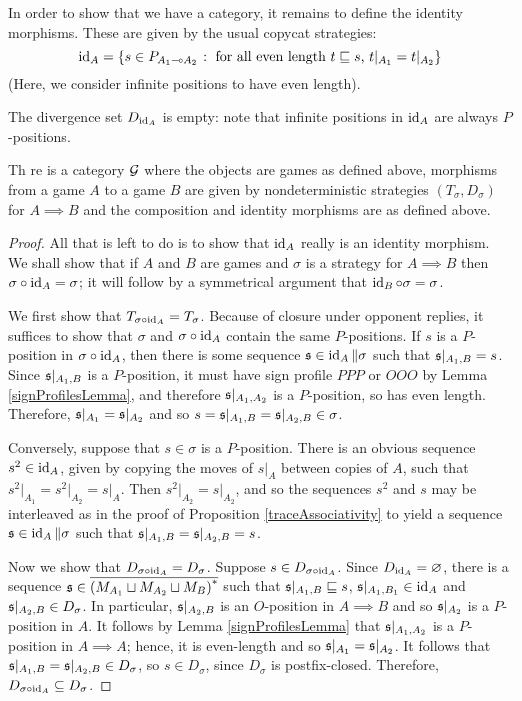 \documentclass{article}
\begin{document}
In order to show that we have a category, it remains to define the identity morphisms.  These are given by the usual copycat strategies:
\[
  \operatorname{id}_A = \{s\in P_{A_1\multimap A_2}\;\colon\;\textrm{for all even length $t\sqsubseteq s$, $t\vert_{A_1}=t\vert_{A_2}$}\}
  \]
(Here, we consider infinite positions to have even length).

The divergence set $D_{\operatorname{id}_A}$ is empty: note that infinite positions in $\operatorname{id}_A$ are always $P$-positions.

\begin{theorem}
  Th re is a category $\mathcal G$ where the objects are games as defined above, morphisms from a game $A$ to a game $B$ are given by nondeterministic strategies $(T_\sigma, D_\sigma)$ for $A\implies B$ and the composition and identity morphisms are as defined above.
  \begin{proof}
    All that is left to do is to show that $\operatorname{id}_A$ really is an identity morphism.  We shall show that if $A$ and $B$ are games and $\sigma$ is a strategy for $A\implies B$ then $\sigma \circ \operatorname{id}_A=\sigma$; it will follow by a symmetrical argument that $\operatorname{id}_B \circ \sigma = \sigma$.

    We first show that $T_{\sigma \circ \operatorname{id}_A}=T_\sigma$.  Because of closure under opponent replies, it suffices to show that $\sigma$ and $\sigma \circ \operatorname{id}_A$ contain the same $P$-positions.  If $s$ is a $P$-position in $\sigma \circ \operatorname{id}_A$, then there is some sequence $\mathfrak s\in\operatorname{id}_A\|\sigma$ such that $\mathfrak s\vert_{A_1,B}=s$.  Since $\mathfrak s\vert_{A_1,B}$ is a $P$-position, it must have sign profile $PPP$ or $OOO$ by Lemma \ref{signProfilesLemma}, and therefore $\mathfrak s\vert_{A_1,A_2}$ is a $P$-position, so has even length.  Therefore, $\mathfrak s\vert_{A_1}=\mathfrak s\vert_{A_2}$ and so $s=\mathfrak s\vert_{A_1,B}=\mathfrak s\vert_{A_2,B}\in\sigma$.

    Conversely, suppose that $s\in\sigma$ is a $P$-position.  There is an obvious sequence $s^2\in\operatorname{id}_A$, given by copying the moves of $s\vert_A$ between copies of $A$, such that $s^2\vert_{A_1}=s^2\vert_{A_2}=s\vert_A$.  Then $s^2\vert_{A_2}=s\vert_{A_2}$, and so the sequences $s^2$ and $s$ may be interleaved as in the proof of Proposition \ref{traceAssociativity} to yield a sequence $\mathfrak s\in\operatorname{id}_A\|\sigma$ such that $\mathfrak s\vert_{A_1,B}=\mathfrak s\vert_{A_2,B}=s$.  

    Now we show that $D_{\sigma \circ \operatorname{id}_A}=D_\sigma$.  Suppose $s\in D_{\sigma \circ \operatorname{id}_A}$.  Since $D_{\operatorname{id}_A}=\varnothing$, there is a sequence $\mathfrak s\in{\overline{{(M_{A_1}\sqcup M_{A_2}\sqcup M_B)}^{*}}}$ such that $\mathfrak s\vert_{A_1,B}\sqsubseteq s$, $\mathfrak s\vert_{A_1,B_1}\in\operatorname{id}_A$ and $\mathfrak s\vert_{A_2,B}\in D_\sigma$.  In particular, $\mathfrak s\vert_{A_2,B}$ is an $O$-position in $A\implies B$ and so $\mathfrak s\vert_{A_2}$ is a $P$-position in $A$.  It follows by Lemma \ref{signProfilesLemma} that $\mathfrak s\vert_{A_1,A_2}$ is a $P$-position in $A\implies A$; hence, it is even-length and so $\mathfrak s\vert_{A_1}=\mathfrak s\vert_{A_2}$.  It follows that $\mathfrak s\vert_{A_1,B}=\mathfrak s\vert_{A_2,B}\in D_\sigma$, so $s\in D_\sigma$, since $D_\sigma$ is postfix-closed.  Therefore, $D_{\sigma \circ \operatorname{id}_A}\subseteq D_\sigma$.  


\end{proof}
\end{theorem}
\end{document}
